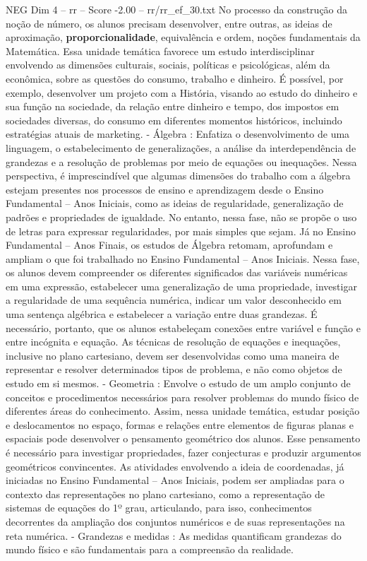 \begin{textsample}{NEG Dim 4 – rr – Score -2.00 – rr/rr\_ef\_30.txt}
No processo da construção da noção de número, os alunos precisam desenvolver, entre outras, as ideias de aproximação, \textbf{proporcionalidade}, equivalência e ordem, noções fundamentais da Matemática.
Essa unidade temática favorece um estudo interdisciplinar envolvendo as dimensões culturais, sociais, políticas e psicológicas, além da econômica, sobre as questões do consumo, trabalho e dinheiro.
É possível, por exemplo, desenvolver um projeto com a História, visando ao estudo do dinheiro e sua função na sociedade, da relação entre dinheiro e tempo, dos impostos em sociedades diversas, do consumo em diferentes momentos históricos, incluindo estratégias atuais de marketing. - Álgebra : Enfatiza o desenvolvimento de uma linguagem, o estabelecimento de generalizações, a análise da interdependência de grandezas e a resolução de problemas por meio de equações ou inequações.
Nessa perspectiva, é imprescindível que algumas dimensões do trabalho com a álgebra estejam presentes nos processos de ensino e aprendizagem desde o Ensino Fundamental – Anos Iniciais, como as ideias de regularidade, generalização de padrões e propriedades de igualdade.
No entanto, nessa fase, não se propõe o uso de letras para expressar regularidades, por mais simples que sejam.
Já no Ensino Fundamental – Anos Finais, os estudos de Álgebra retomam, aprofundam e ampliam o que foi trabalhado no Ensino Fundamental – Anos Iniciais.
Nessa fase, os alunos devem compreender os diferentes significados das variáveis numéricas em uma expressão, estabelecer uma generalização de uma propriedade, investigar a regularidade de uma sequência numérica, indicar um valor desconhecido em uma sentença algébrica e estabelecer a variação entre duas grandezas.
É necessário, portanto, que os alunos estabeleçam conexões entre variável e função e entre incógnita e equação.
As técnicas de resolução de equações e inequações, inclusive no plano cartesiano, devem ser desenvolvidas como uma maneira de representar e resolver determinados tipos de problema, e não como objetos de estudo em si mesmos. - Geometria : Envolve o estudo de um amplo conjunto de conceitos e procedimentos necessários para resolver problemas do mundo físico de diferentes áreas do conhecimento.
Assim, nessa unidade temática, estudar posição e deslocamentos no espaço, formas e relações entre elementos de figuras planas e espaciais pode desenvolver o pensamento geométrico dos alunos.
Esse pensamento é necessário para investigar propriedades, fazer conjecturas e produzir argumentos geométricos convincentes.
As atividades envolvendo a ideia de coordenadas, já iniciadas no Ensino Fundamental – Anos Iniciais, podem ser ampliadas para o contexto das representações no plano cartesiano, como a representação de sistemas de equações do 1º grau, articulando, para isso, conhecimentos decorrentes da ampliação dos conjuntos numéricos e de suas representações na reta numérica. - Grandezas e medidas : As medidas quantificam grandezas do mundo físico e são fundamentais para a compreensão da realidade.

\end{textsample}
